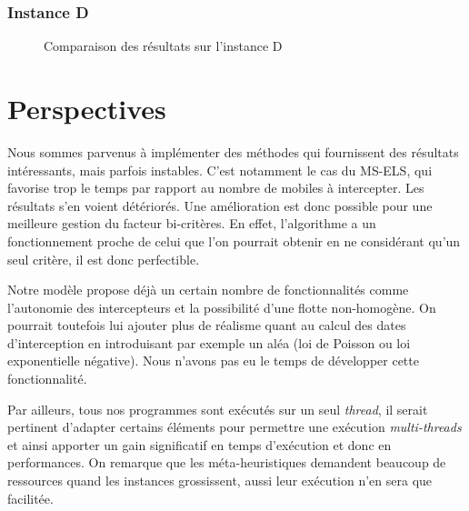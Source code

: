             \subsubsection{Instance D}
                \begin{figure}[H]
                    
                    \caption{Comparaison des résultats sur l'instance D}
                    \label{fig:40m5i4d-comp}
                \end{figure}
				
    \newpage
    \section{Perspectives}

        Nous sommes parvenus à implémenter des méthodes qui fournissent des résultats intéressants, mais parfois instables. C'est notamment le cas du MS-ELS, qui favorise trop le temps par rapport au nombre de mobiles à intercepter. Les résultats s'en voient détériorés. Une amélioration est donc possible pour une meilleure gestion du facteur bi-critères. En effet, l'algorithme a un fonctionnement proche de celui que l'on pourrait obtenir en ne considérant qu'un seul critère, il est donc perfectible.

        Notre modèle propose déjà un certain nombre de fonctionnalités comme l'autonomie des intercepteurs et la possibilité d'une flotte non-homogène. On pourrait toutefois lui ajouter plus de réalisme quant au calcul des dates d'interception en introduisant par exemple un aléa (loi de Poisson ou loi exponentielle négative). Nous n'avons pas eu le temps de développer cette fonctionnalité.

        Par ailleurs, tous nos programmes sont exécutés sur un seul \emph{thread}, il serait pertinent d'adapter certains éléments pour permettre une exécution \emph{multi-threads} et ainsi apporter un gain significatif en temps d'exécution et donc en performances. On remarque que les méta-heuristiques demandent beaucoup de ressources quand les instances grossissent, aussi leur exécution n'en sera que facilitée.
